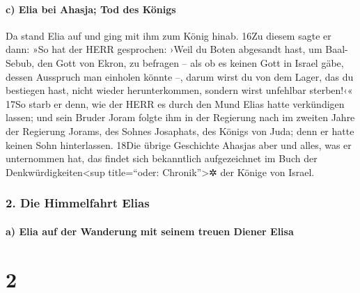 \hypertarget{c-elia-bei-ahasja-tod-des-kuxf6nigs}{%
\paragraph{c) Elia bei Ahasja; Tod des
Königs}\label{c-elia-bei-ahasja-tod-des-kuxf6nigs}}

Da stand Elia auf und ging mit ihm zum König hinab. 16Zu diesem sagte er
dann: »So hat der HERR gesprochen: ›Weil du Boten abgesandt hast, um
Baal-Sebub, den Gott von Ekron, zu befragen -- als ob es keinen Gott in
Israel gäbe, dessen Ausspruch man einholen könnte --, darum wirst du von
dem Lager, das du bestiegen hast, nicht wieder herunterkommen, sondern
wirst unfehlbar sterben!‹« 17So starb er denn, wie der HERR es durch den
Mund Elias hatte verkündigen lassen; und sein Bruder Joram folgte ihm in
der Regierung nach im zweiten Jahre der Regierung Jorams, des Sohnes
Josaphats, des Königs von Juda; denn er hatte keinen Sohn hinterlassen.
18Die übrige Geschichte Ahasjas aber und alles, was er unternommen hat,
das findet sich bekanntlich aufgezeichnet im Buch der
Denkwürdigkeiten\textless sup title=``oder: Chronik''\textgreater✲ der
Könige von Israel.

\hypertarget{die-himmelfahrt-elias}{%
\subsubsection{2. Die Himmelfahrt Elias}\label{die-himmelfahrt-elias}}

\hypertarget{a-elia-auf-der-wanderung-mit-seinem-treuen-diener-elisa}{%
\paragraph{a) Elia auf der Wanderung mit seinem treuen Diener
Elisa}\label{a-elia-auf-der-wanderung-mit-seinem-treuen-diener-elisa}}

\hypertarget{section-1}{%
\section{2}\label{section-1}}

